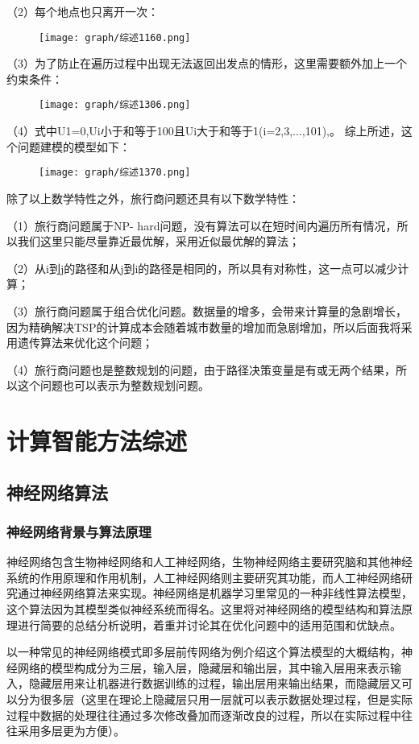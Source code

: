 \documentclass{cjc}
\begin{document}
（2）每个地点也只离开一次：
\begin{figure}
  \centering
  \texttt{[image: graph/综述1160.png]}
\end{figure}

（3）为了防止在遍历过程中出现无法返回出发点的情形，这里需要额外加上一个约束条件：
\begin{figure}
  \centering
  \texttt{[image: graph/综述1306.png]}
\end{figure}

（4）式中U1=0,Ui小于和等于100且Ui大于和等于1(i=2,3,...,101),。
综上所述，这个问题建模的模型如下：
\begin{figure}
  \centering
  \texttt{[image: graph/综述1370.png]}
\end{figure}

除了以上数学特性之外，旅行商问题还具有以下数学特性：

（1）旅行商问题属于NP- hard问题，没有算法可以在短时间内遍历所有情况，所以我们这里只能尽量靠近最优解，采用近似最优解的算法；

（2）从i到j的路径和从j到i的路径是相同的，所以具有对称性，这一点可以减少计算；

（3）旅行商问题属于组合优化问题。数据量的增多，会带来计算量的急剧增长，因为精确解决TSP的计算成本会随着城市数量的增加而急剧增加，所以后面我将采用遗传算法来优化这个问题；

（4）旅行商问题也是整数规划的问题，由于路径决策变量是有或无两个结果，所以这个问题也可以表示为整数规划问题。

\section{计算智能方法综述}
\subsection{神经网络算法}
\subsubsection{神经网络背景与算法原理}
神经网络包含生物神经网络和人工神经网络，生物神经网络主要研究脑和其他神经系统的作用原理和作用机制，人工神经网络则主要研究其功能，而人工神经网络研究通过神经网络算法来实现。神经网络是机器学习里常见的一种非线性算法模型，这个算法因为其模型类似神经系统而得名。这里将对神经网络的模型结构和算法原理进行简要的总结分析说明，着重并讨论其在优化问题中的适用范围和优缺点。

以一种常见的神经网络模式即多层前传网络为例介绍这个算法模型的大概结构，神经网络的模型构成分为三层，输入层，隐藏层和输出层，其中输入层用来表示输入，隐藏层用来让机器进行数据训练的过程，输出层用来输出结果，而隐藏层又可以分为很多层（这里在理论上隐藏层只用一层就可以表示数据处理过程，但是实际过程中数据的处理往往通过多次修改叠加而逐渐改良的过程，所以在实际过程中往往采用多层更为方便）。
\end{document}
